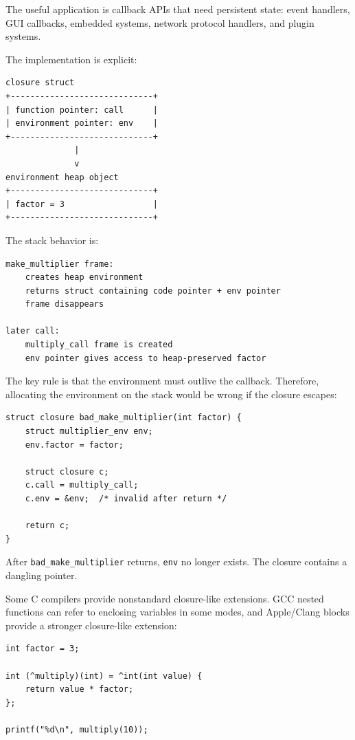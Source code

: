 The useful application is callback APIs that need persistent state: event handlers, GUI callbacks, embedded systems, network protocol handlers, and plugin systems.

The implementation is explicit:

\begin{verbatim}
closure struct
+-----------------------------+
| function pointer: call      |
| environment pointer: env    |
+-----------------------------+
              |
              v
environment heap object
+-----------------------------+
| factor = 3                  |
+-----------------------------+
\end{verbatim}

The stack behavior is:

\begin{verbatim}
make_multiplier frame:
    creates heap environment
    returns struct containing code pointer + env pointer
    frame disappears

later call:
    multiply_call frame is created
    env pointer gives access to heap-preserved factor
\end{verbatim}

The key rule is that the environment must outlive the callback. Therefore, allocating the environment on the stack would be wrong if the closure escapes:

\begin{verbatim}
struct closure bad_make_multiplier(int factor) {
    struct multiplier_env env;
    env.factor = factor;

    struct closure c;
    c.call = multiply_call;
    c.env = &env;  /* invalid after return */

    return c;
}
\end{verbatim}

After \texttt{bad\_make\_multiplier} returns, \texttt{env} no longer exists. The closure contains a dangling pointer.

Some C compilers provide nonstandard closure-like extensions. GCC nested functions can refer to enclosing variables in some modes, and Apple/Clang blocks provide a stronger closure-like extension:

\begin{verbatim}
int factor = 3;

int (^multiply)(int) = ^int(int value) {
    return value * factor;
};

printf("%d\n", multiply(10));
\end{verbatim}

